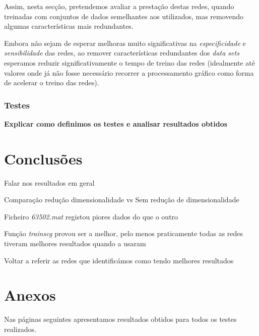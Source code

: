 \documentclass{article}
\begin{document}
Assim, nesta secção, pretendemos avaliar a prestação destas redes, quando treinadas com conjuntos de dados semelhantes aos utilizados, mas removendo algumas características mais redundantes.

Embora não sejam de esperar melhoras muito significativas na \emph{especificidade} e \emph{sensibilidade} das redes, ao remover características redundantes dos \emph{data sets} esperamos reduzir significativamente o tempo de treino das redes (idealmente até valores onde já não fosse necessário recorrer a processamento gráfico como forma de acelerar o treino das redes).

\subsubsection{Testes}

\textbf{Explicar como definimos os testes e analisar resultados obtidos}


\pagebreak

\section{Conclusões}

Falar nos resultados em geral

Comparação redução dimensionalidade vs Sem redução de dimensionalidade

Ficheiro \emph{63502.mat} registou piores dados do que o outro

Função \emph{trainscg} provou ser a melhor, pelo menos praticamente todas as redes tiveram melhores resultados quando a usaram

Voltar a referir as redes que identificámos como tendo melhores resultados


\pagebreak

\section{Anexos}

Nas páginas seguintes apresentamos resultados obtidos para todos os testes realizados.


\end{document}
